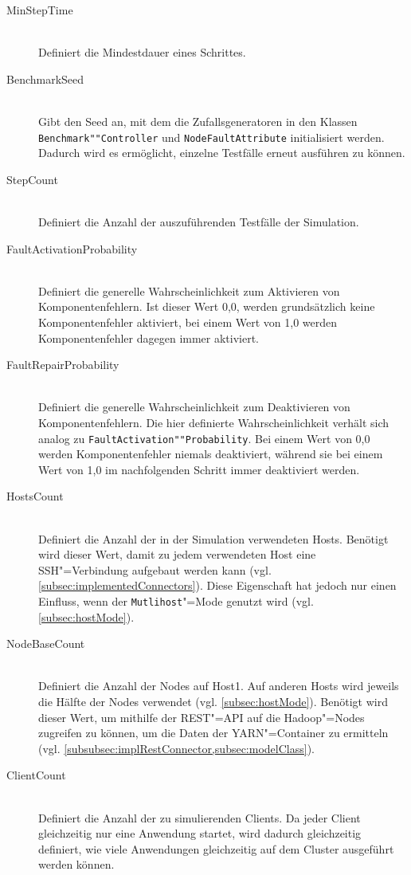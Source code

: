 \begin{description}
    \item [MinStepTime] \hfill \\
        Definiert die Mindestdauer eines Schrittes.
        
    \item[BenchmarkSeed] \hfill \\
        Gibt den Seed an, mit dem die Zufallsgeneratoren in den Klassen \texttt{Benchmark""Controller} und \texttt{NodeFaultAttribute} initialisiert werden.
        Dadurch wird es ermöglicht, einzelne Testfälle erneut ausführen zu können.
        
    \item[StepCount] \hfill \\
        Definiert die Anzahl der auszuführenden Testfälle der Simulation.
        
    \item[FaultActivationProbability] \hfill \\
        Definiert die generelle Wahrscheinlichkeit zum Aktivieren von Komponentenfehlern.
        Ist dieser Wert 0,0, werden grundsätzlich keine Komponentenfehler aktiviert, bei einem Wert von 1,0 werden Komponentenfehler dagegen immer aktiviert.
        
    \item[FaultRepairProbability] \hfill \\
        Definiert die generelle Wahrscheinlichkeit zum Deaktivieren von Komponentenfehlern.
        Die hier definierte Wahrscheinlichkeit verhält sich analog zu \texttt{FaultActivation""Probability}.
        Bei einem Wert von 0,0 werden Komponentenfehler niemals deaktiviert, während sie bei einem Wert von 1,0 im nachfolgenden Schritt immer deaktiviert werden.
        
    \item[HostsCount] \hfill \\
        Definiert die Anzahl der in der Simulation verwendeten Hosts.
        Benötigt wird dieser Wert, damit zu jedem verwendeten Host eine SSH"=Verbindung aufgebaut werden kann (vgl. \cref{subsec:implementedConnectors}).
        Diese Eigenschaft hat jedoch nur einen Einfluss, wenn der \texttt{Mutlihost}"=Mode genutzt wird (vgl. \cref{subsec:hostMode}).
        
    \item[NodeBaseCount] \hfill \\
        Definiert die Anzahl der Nodes auf Host1.
        Auf anderen Hosts wird jeweils die Hälfte der Nodes verwendet (vgl. \cref{subsec:hostMode}).
        Benötigt wird dieser Wert, um mithilfe der REST"=API auf die Hadoop"=Nodes zugreifen zu können, um die Daten der YARN"=Container zu ermitteln (vgl. \cref{subsubsec:implRestConnector,subsec:modelClass}).
        
    \item[ClientCount] \hfill \\
        Definiert die Anzahl der zu simulierenden Clients.
        Da jeder Client gleichzeitig nur eine Anwendung startet, wird dadurch gleichzeitig definiert, wie viele Anwendungen gleichzeitig auf dem Cluster ausgeführt werden können.
\end{description}


